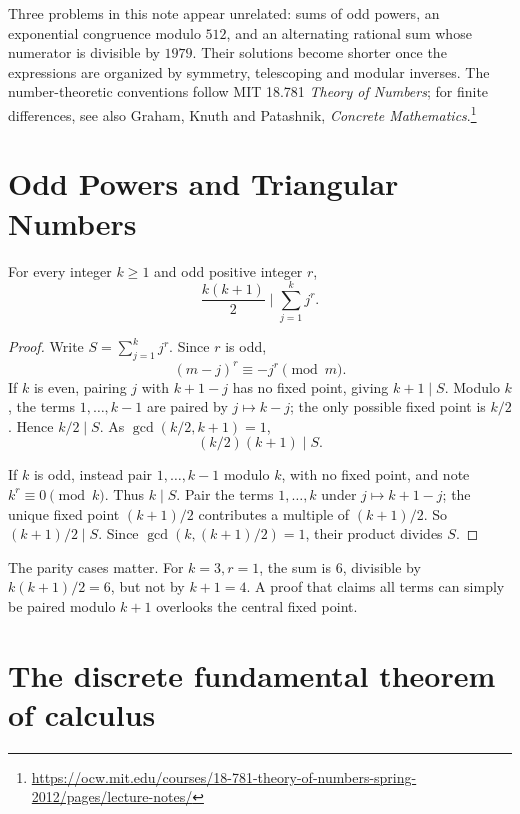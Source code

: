 
Three problems in this note appear unrelated: sums of odd powers, an exponential congruence modulo \(512\), and an alternating rational sum whose numerator is divisible by \(1979\). Their solutions become shorter once the expressions are organized by symmetry, telescoping and modular inverses. The number-theoretic conventions follow MIT 18.781 \emph{Theory of Numbers}; for finite differences, see also Graham, Knuth and Patashnik, \emph{Concrete Mathematics}.\footnote{\url{https://ocw.mit.edu/courses/18-781-theory-of-numbers-spring-2012/pages/lecture-notes/}}

\section{Odd Powers and Triangular Numbers}

\begin{theorem}
For every integer \(k\ge1\) and odd positive integer \(r\),
\[
 \boxed{\frac{k(k+1)}2\;\Big|\;\sum_{j=1}^k j^r.}
\]
\end{theorem}

\begin{proof}
Write \(S=\sum_{j=1}^k j^r\). Since \(r\) is odd,
\[
 (m-j)^r\equiv-j^r\pmod m.
\]
If \(k\) is even, pairing \(j\) with \(k+1-j\) has no fixed point, giving \(k+1\mid S\). Modulo \(k\), the terms \(1,\ldots,k-1\) are paired by \(j\mapsto k-j\); the only possible fixed point is \(k/2\). Hence \(k/2\mid S\). As \(\gcd(k/2,k+1)=1\),
\[
 (k/2)(k+1)\mid S.
\]

If \(k\) is odd, instead pair \(1,\ldots,k-1\) modulo \(k\), with no fixed point, and note \(k^r\equiv0\pmod{k}\). Thus \(k\mid S\). Pair the terms \(1,\ldots,k\) under \(j\mapsto k+1-j\); the unique fixed point \((k+1)/2\) contributes a multiple of \((k+1)/2\). So \((k+1)/2\mid S\). Since \(\gcd(k,(k+1)/2)=1\), their product divides \(S\).
\end{proof}

The parity cases matter. For \(k=3,r=1\), the sum is \(6\), divisible by \(k(k+1)/2=6\), but not by \(k+1=4\). A proof that claims all terms can simply be paired modulo \(k+1\) overlooks the central fixed point.

\section{The discrete fundamental theorem of calculus}

